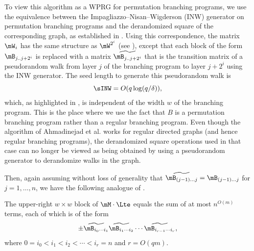     To view this algorithm as a WPRG for permutation branching programs, we use
    the equivalence between the Impagliazzo--Nisan--Wigderson (INW) generator on permutation branching programs and the derandomized square of the corresponding graph, as established in \cite{RozenmanVa05,HozaPyVa21}.
    Using this correspondence, the matrix $\mW_i$ has the same structure as $\mW^{2^i}$ (see ), except that each block of the form $\mB_{j..j+2^i}$ is replaced with a matrix $\widetilde{\mB_{j..j+2^i}}$ that is the transition matrix of a pseudorandom
    walk from layer $j$ of the branching program to layer $j+2^i$ using the INW generator.  
    The seed length to generate this pseudorandom walk is
    $$\sINW = O(q\log(q/\delta)),$$
    which, as highlighted in \cite{HozaPyVa21}, is independent of the width $w$ of the branching program.
    This is the place where we use the fact that $B$ is a permutation branching program rather than a regular branching program.  Even though the algorithm of Ahmadinejad et al. works for regular directed graphs (and hence regular branching programs), the derandomized square operations used in that case can no longer be viewed as being obtained by using a pseudorandom generator to derandomize walks in the graph.
    
    Then, again assuming without loss of generality that 
    $\widetilde{\mB_{(j-1)\ldots j}}=\mB_{(j-1)\ldots j}$ for $j=1,\ldots,n$, we have
    the following analogue of . %
    \begin{observation} \label{obs:cycle}
    The upper-right $w\times w$ block of $\mM \cdot \Lte$ equals the sum of at most $n^{O(m)}$ terms, each of which is of the form 
    \begin{equation} \label{eqn:permutation-terms}
    \pm \widetilde{\mB_{i_0\cdots i_1}}
    \widetilde{\mB_{i_1\cdots i_2}}
    \cdots
    \widetilde{\mB_{i_{r-1}\cdots i_r}},
    \end{equation}
    where $0=i_0<i_1<i_2<\cdots<i_r=n$ and $r=O(qm)$.
    \end{observation}
    
